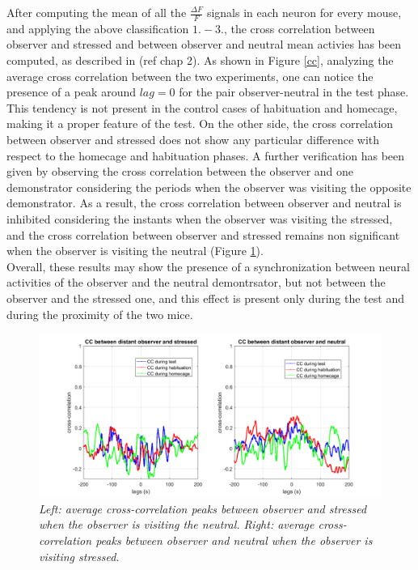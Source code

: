 \documentclass[12pt, a4paper]{report}
\begin{document}
After computing the mean of all the $\frac{\Delta F}{F}$ signals in each neuron for every mouse, and applying the above classification $1.-3.$, the cross correlation between observer and stressed and between observer and neutral mean activies has been computed, as described in (ref chap 2). As shown in Figure \ref*{cc}, analyzing the average cross correlation between the two experiments, one can notice the presence of a peak around $ lag=0 $ for the pair observer-neutral in the test phase. This tendency is not present in the control cases of habituation and homecage, making it a proper feature of the test. On the other side, the cross correlation between observer and stressed does not show any particular difference with respect to the homecage and habituation phases. A further verification has been given by observing the cross correlation between the observer and one demonstrator considering the periods when the observer was visiting the opposite demonstrator. As a result, the cross correlation between observer and neutral is inhibited considering the instants when the observer was visiting the stressed, and the cross correlation between observer and stressed remains non significant when the observer is visiting the neutral (Figure \ref{distant}).\\ Overall, these results may show the presence of a synchronization between neural activities of the observer and the neutral demontrsator, but not between the observer and the stressed one, and this effect is present only during the test and during the proximity of the two mice.

\begin{figure}[H]
	
	\begin{center}
		\hspace*{-1.4cm}
		\includegraphics[scale=.5]{cc_distant.png} 
	\end{center} 
	\caption{\textit{Left: average cross-correlation peaks between observer and stressed when the observer is visiting the neutral. Right: average cross-correlation peaks between observer and neutral when the observer is visiting stressed.}} \label{distant}
	
\end{figure}
\end{document}
